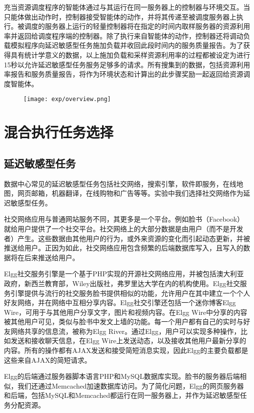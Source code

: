 充当资源调度程序的智能体通过与其运行在同一服务器上的控制器与环境交互。当只能体做出动作时，控制器接受智能体的动作，并将其传递至被调度服务器上执行。被调度的服务器上运行的轻量控制器将在指定的时间内取样服务器的资源利用率并返回给调度程序端的控制器。除了执行来自智能体的动作，控制器还将调动负载模拟程序向延迟敏感型任务施加负载并收回此段时间内的服务质量报告。为了获得具有统计学意义的数据，以上施加负载和采样资源利用率的过程都被设定为进行15秒以允许延迟敏感型任务服务足够多的请求。所有搜集到的数据，包括资源利用率报告和服务质量报告，将作为环境状态和计算出的此步骤奖励一起返回给资源调度智能体。

\begin{figure}
  \centering
    \centering
    \texttt{[image: exp/overview.png]}
    \label{fig:overview}    
\end{figure}


\section{混合执行任务选择}
\subsection{延迟敏感型任务}
数据中心常见的延迟敏感型任务包括社交网络，搜索引擎，软件即服务，在线地图，网页邮箱，机器翻译，在线购物和广告等等。实验中我们选择社交网络作为延迟敏感型任务。

社交网络应用与普通网站服务不同，其更多是一个平台。例如脸书（Facebook）就给用户提供了一个社交平台。社交网络上的大部分数据是由用户（而不是开发者）产生。这些数据由其他用户的行为，或外来资源的变化而引起动态更新，并被推送给用户。正因为如此，社交网络应用包含频繁的后端数据库写入，且写入的数据将在后来推送给用户。

Elgg社交服务引擎是一个基于PHP实现的开源社交网络应用，并被包括澳大利亚政府，新西兰教育部，Wiley出版社，弗罗里达大学在内的机构使用\cite{palit2016demystifying}。Elgg社交服务引擎提供与流行的社交服务脸书提供相似的功能，允许用户在其中建立一个个人好友网络，并在网络中互相分享内容。Elgg社交引擎还包括一个迷你博客Elgg Wire，可用于与其他用户分享文字，图片和视频内容。在Elgg Wire中分享的内容被其他用户可见，类似与脸书中发文上墙的功能。每一个用户都有自己的实时与好友网络共享的信息流，被称为Elgg River。通过Elgg，用户可以实现多种操作，比如发送和接收聊天信息，在Elgg Wire上发送动态，以及接收其他用户最新分享的内容。所有的操作都有AJAX发送和接受简短消息实现，因此Elgg的主要负载都是这些来自AJAX的简短请求。

Elgg的后端通过服务器脚本语言PHP和MySQL数据库实现。脸书的服务器后端相似\cite{nishtala2013scaling}，我们还通过Memcached加速数据库访问。为了简化问题，Elgg的网页服务器和后端，包括MySQL和Memcached都运行在同一服务器上，并作为延迟敏感型任务分配资源。

